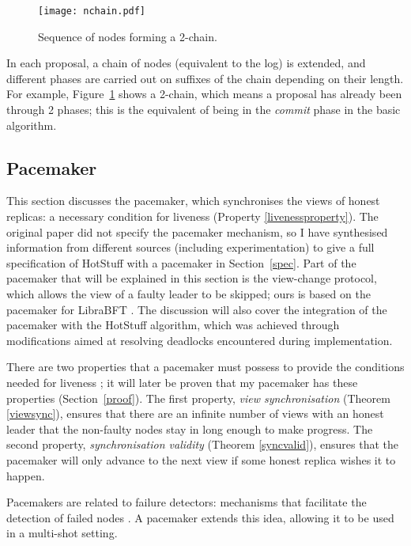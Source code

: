 \begin{figure}[h!]
\centering
\texttt{[image: nchain.pdf]}
\caption{Sequence of nodes forming a 2-chain.}
\label{nchain}
\end{figure}

In each proposal, a chain of nodes (equivalent to the log) is extended, and different phases are carried out on suffixes of the chain depending on their length. For example, Figure~\ref{nchain} shows a 2-chain, which means a proposal has already been through 2 phases; this is the equivalent of being in the \textit{commit} phase in the basic algorithm.

\subsection{Pacemaker} \label{pacemaker}

This section discusses the pacemaker, which synchronises the views of honest replicas: a necessary condition for liveness (Property \ref{livenessproperty}). The original paper did not specify the pacemaker mechanism, so I have synthesised information from different sources (including experimentation) to give a full specification of HotStuff with a pacemaker in Section~\ref{spec}. Part of the pacemaker that will be explained in this section is the view-change protocol, which allows the view of a faulty leader to be skipped; ours is based on the pacemaker for LibraBFT \cite{baudetStateMachineReplication2019, ittai}. The discussion will also cover the integration of the pacemaker with the HotStuff algorithm, which was achieved through modifications aimed at resolving deadlocks encountered during implementation.

There are two properties that a pacemaker must possess to provide the conditions needed for liveness \cite{naorCogsworthByzantineView2021}; it will later be proven that my pacemaker has these properties (Section~\ref{proof}). The first property, \textit{view synchronisation} (Theorem \ref{viewsync}), ensures that there are an infinite number of views with an honest leader that the non-faulty nodes stay in long enough to make progress. The second property, \textit{synchronisation validity} (Theorem \ref{syncvalid}), ensures that the pacemaker will only advance to the next view if some honest replica wishes it to happen.

Pacemakers are related to failure detectors: mechanisms that facilitate the detection of failed nodes \cite{chandraWeakestFailureDetector1996,chandraUnreliableFailureDetectors1996}. A pacemaker extends this idea, allowing it to be used in a multi-shot setting.

